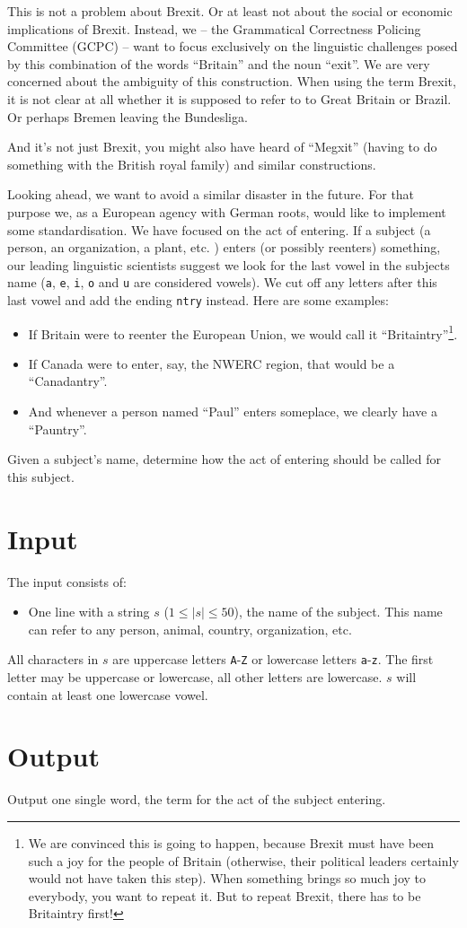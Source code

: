 
This is not a problem about Brexit. Or at least not about the social or economic implications of Brexit. Instead, we -- the Grammatical Correctness Policing Committee (GCPC) -- want to focus exclusively on the linguistic challenges posed by this combination of the words ``Britain'' and the noun ``exit''. We are very concerned about the ambiguity of this construction. When using the term Brexit, it is not clear at all whether it is supposed to refer to to Great Britain or Brazil. Or perhaps Bremen leaving the Bundesliga.

And it's not just Brexit, you might also have heard of ``Megxit'' (having to do something with the British royal family) and similar constructions.

Looking ahead, we want to avoid a similar disaster in the future. For that purpose we, as a European agency with German roots, would like to implement some standardisation. We have focused on the act of entering. If a subject (a person, an organization, a plant, etc. ) enters (or possibly reenters) something, our leading linguistic scientists suggest we look for the last vowel in the subjects name (\texttt{a}, \texttt{e}, \texttt{i}, \texttt{o} and \texttt{u} are considered vowels). We cut off any letters after this last vowel and add the ending \texttt{ntry} instead. Here are some examples:

\begin{itemize}
  \item If Britain were to reenter the European Union, we would call it ``Britaintry''\footnote{We are convinced this is going to happen, because Brexit must have been such a joy for the people of Britain (otherwise, their political leaders certainly would not have taken this step). When something brings so much joy to everybody, you want to repeat it. But to repeat Brexit, there has to be Britaintry first!}.
\item If Canada were to enter, say, the NWERC region, that would be a ``Canadantry''.
\item And whenever a person named ``Paul'' enters someplace, we clearly have a ``Pauntry''.
\end{itemize}

Given a subject's name, determine how the act of entering should be called for this subject.

\section*{Input}
The input consists of:
\begin{itemize}
  \item One line with a string $s$ ($1 \le |s| \le 50$), the name of the subject. This name can refer to any person, animal, country, organization, etc.
\end{itemize}
All characters in $s$ are uppercase letters \texttt{A}-\texttt{Z} or lowercase letters \texttt{a}-\texttt{z}.
The first letter may be uppercase or lowercase, all other letters are lowercase.
$s$ will contain at least one lowercase vowel.

\section*{Output}
Output one single word, the term for the act of the subject entering.
